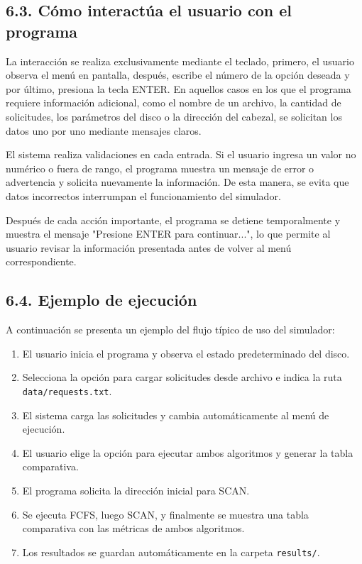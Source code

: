 \documentclass[14pt,letterpaper]{extarticle}
\begin{document}
\subsection*{6.3. Cómo interactúa el usuario con el programa}

La interacción se realiza exclusivamente mediante el teclado, primero, el usuario observa el menú en pantalla, después, escribe el número de la opción deseada y por último, presiona la tecla ENTER. En aquellos casos en los que el programa requiere información adicional, como el nombre de un archivo, la cantidad de solicitudes, los parámetros del disco o la dirección del cabezal, se solicitan los datos uno por uno mediante mensajes claros.

El sistema realiza validaciones en cada entrada. Si el usuario ingresa un valor no numérico o fuera de rango, el programa muestra un mensaje de error o advertencia y solicita nuevamente la información. De esta manera, se evita que datos incorrectos interrumpan el funcionamiento del simulador.

Después de cada acción importante, el programa se detiene temporalmente y muestra el mensaje "Presione ENTER para continuar...", lo que permite al usuario revisar la información presentada antes de volver al menú correspondiente.

\subsection*{6.4. Ejemplo de ejecución}

A continuación se presenta un ejemplo del flujo típico de uso del simulador:

\begin{enumerate}
    \item El usuario inicia el programa y observa el estado predeterminado del disco.
    \item Selecciona la opción para cargar solicitudes desde archivo e indica la ruta \texttt{data/requests.txt}.
    \item El sistema carga las solicitudes y cambia automáticamente al menú de ejecución.
    \item El usuario elige la opción para ejecutar ambos algoritmos y generar la tabla comparativa.
    \item El programa solicita la dirección inicial para SCAN.
    \item Se ejecuta FCFS, luego SCAN, y finalmente se muestra una tabla comparativa con las métricas de ambos algoritmos.
    \item Los resultados se guardan automáticamente en la carpeta \texttt{results/}.
\end{enumerate}
\end{document}
